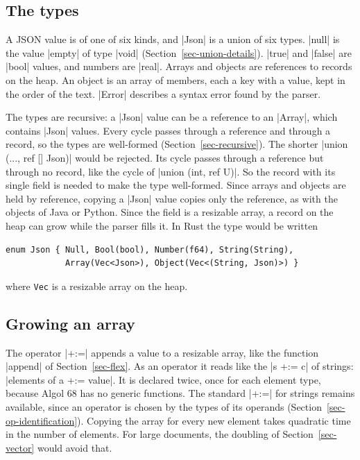 \subsection*{The types}


A JSON value is of one of six kinds, and \code|Json| is a union of six
types. \code|null| is the value \code|empty| of type \code|void|
(Section~\ref{sec-union-details}). \code|true| and \code|false| are
\code|bool| values, and numbers are \code|real|. Arrays and objects are
references to records on the heap. An object is an array of members,
each a key with a value, kept in the order of the text. \code|Error|
describes a syntax error found by the parser.

The types are recursive: a \code|Json| value can be a reference to an
\code|Array|, which contains \code|Json| values. Every cycle passes
through a reference and through a record, so the types are well-formed
(Section~\ref{sec-recursive}). The shorter \code|union (..., ref [] Json)|
would be rejected. Its cycle passes through a reference but through no
record, like the cycle of \code|union (int, ref U)|. So the record with
its single field is needed to make the type well-formed. Since arrays and
objects are held by reference, copying a \code|Json| value copies only
the reference, as with the objects of Java or Python. Since the field is
a resizable array, a record on the heap can grow while the parser fills
it. In Rust the type would be written
\begin{lstlisting}[language={}]
enum Json { Null, Bool(bool), Number(f64), String(String),
            Array(Vec<Json>), Object(Vec<(String, Json)>) }
\end{lstlisting}
\noindent where \texttt{Vec} is a resizable array on the heap.

\subsection*{Growing an array}


The operator \code|+:=| appends a value to a resizable array, like the
function \code|append| of Section~\ref{sec-flex}. As an operator it
reads like the \code|s +:= c| of strings: \code|elements of a +:= value|.
It is declared twice, once for each element type, because Algol 68 has
no generic functions. The standard \code|+:=| for strings remains
available, since an operator is chosen by the types of its operands
(Section~\ref{sec-op-identification}). Copying the array for every new
element takes quadratic time in the number of elements. For large
documents, the doubling of Section~\ref{sec-vector} would avoid that.

